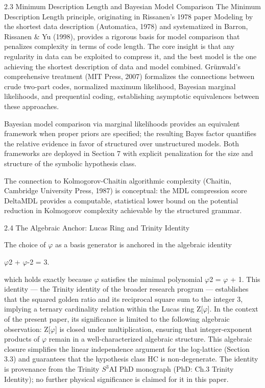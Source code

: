   2.3 Minimum Description Length and Bayesian Model Comparison
  The Minimum Description Length principle, originating in Rissanen's 1978 paper
  Modeling by the shortest data description (Automatica, 1978) and systematized in
  Barron, Rissanen \& Yu (1998), provides a rigorous basis for model comparison that
  penalizes complexity in terms of code length. The core insight is that any regularity in
  data can be exploited to compress it, and the best model is the one achieving the
  shortest description of data and model combined. Grünwald's comprehensive treatment
  (MIT Press, 2007) formalizes the connections between crude two-part codes,
  normalized maximum likelihood, Bayesian marginal likelihoods, and prequential coding,
  establishing asymptotic equivalences between these approaches.

  Bayesian model comparison via marginal likelihoods provides an equivalent framework
  when proper priors are specified; the resulting Bayes factor quantifies the relative
  evidence in favor of structured over unstructured models. Both frameworks are
  deployed in Section 7 with explicit penalization for the size and structure of the
  symbolic hypothesis class.

  The connection to Kolmogorov-Chaitin algorithmic complexity (Chaitin, Cambridge
  University Press, 1987) is conceptual: the MDL compression score DeltaMDL provides a
  computable, statistical lower bound on the potential reduction in Kolmogorov
  complexity achievable by the structured grammar.

  2.4 The Algebraic Anchor: Lucas Ring and Trinity Identity

  The choice of $\varphi$ as a basis generator is anchored in the algebraic identity

  $\varphi$2 + $\varphi$-2 = 3.

  which holds exactly because $\varphi$ satisfies the minimal polynomial $\varphi$2 = $\varphi$ + 1. This
  identity --- the Trinity identity of the broader research program --- establishes that the
  squared golden ratio and its reciprocal square sum to the integer 3, implying a ternary
  cardinality relation within the Lucas ring Z[$\varphi$]. In the context of the present paper, its
  significance is limited to the following algebraic observation: Z[$\varphi$] is closed under
  multiplication, ensuring that integer-exponent products of $\varphi$ remain in a
  well-characterized algebraic structure. This algebraic closure simplifies the linear
  independence argument for the log-lattice (Section 3.3) and guarantees that the
  hypothesis class HC is non-degenerate. The identity is provenance from the Trinity $S^{3}$AI
  PhD monograph (PhD: Ch.3 Trinity Identity); no further physical significance is claimed
  for it in this paper.

